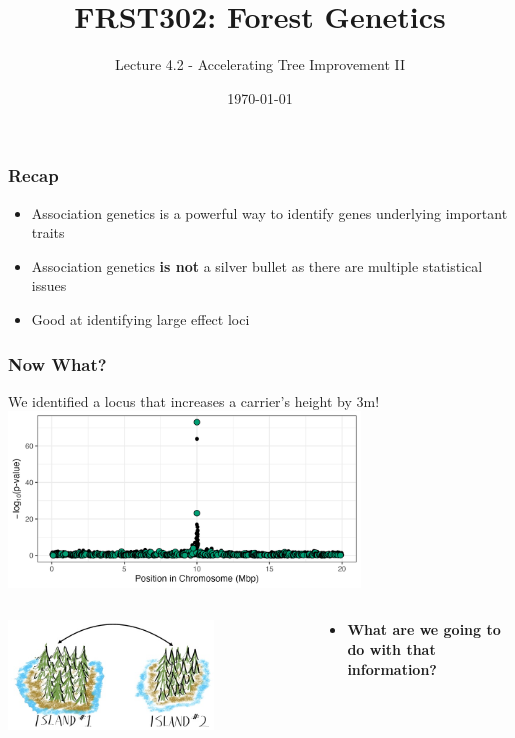 \documentclass[xcolor=dvipsnames]{beamer}
\title{\Huge FRST302: Forest Genetics}
\author{\Large Lecture 4.2 -  Accelerating Tree Improvement II}
\date{\today}
\begin{document}
	\maketitle	
	\begin{frame}
	\frametitle{Recap}
	\begin{itemize}
		\item Association genetics is a powerful way to identify genes underlying important traits
		\item Association genetics \textbf{is not} a silver bullet as there are multiple statistical issues
		\item Good at identifying large effect loci
	
	\end{itemize}

\end{frame}


\begin{frame}
	
\frametitle{Now What?}
We identified a locus that increases a carrier's height by 3m!\\
			
\includegraphics[keepaspectratio, width  = 0.7\textwidth]{img/corPlot_unCorrectedLine.png}


\begin{columns}
	\begin{column}{0.5\textwidth}
		\centering	\includegraphics[keepaspectratio, width  = 0.7\textwidth]{img/treeIslands}
	\end{column}
	\begin{column}{0.5\textwidth}
		\begin{itemize}

			\item \textbf{What are we going to do with that information?}
			
		\end{itemize}
	\end{column}
\end{columns}


\end{frame}
\end{document}
